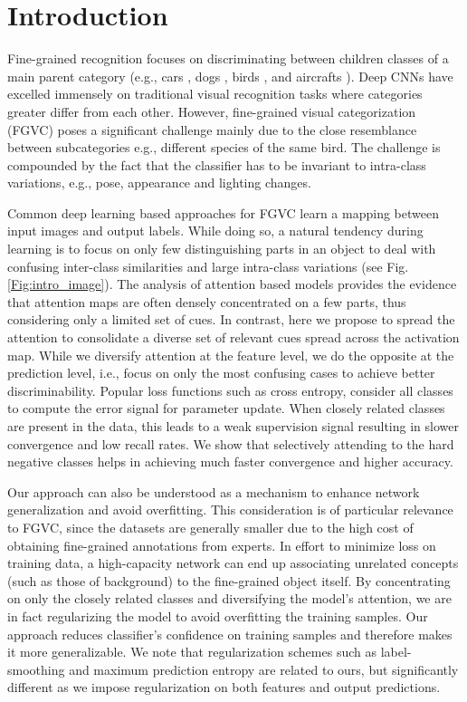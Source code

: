 \documentclass[letterpaper]{article} \usepackage{aaai20}  \usepackage{times}  \usepackage{helvet} \usepackage{courier}  \usepackage[hyphens]{url}  \usepackage{graphicx} \usepackage{multirow}
\begin{document}
\section{Introduction}
Fine-grained recognition focuses on discriminating between children classes of a main parent category (e.g., cars \cite{dataset_cars}, dogs \cite{dataset_dogs}, birds  \cite{dataset_cub}, and aircrafts \cite{dataset_aircraft}). Deep CNNs have excelled immensely on traditional visual recognition tasks where categories greater differ from each other.  However, fine-grained visual categorization (FGVC) poses a significant challenge mainly due to the close resemblance between subcategories e.g., different species of the same bird. The challenge is compounded by the fact that the classifier has to be invariant to intra-class variations, e.g., pose, appearance and lighting changes.


Common deep learning based approaches for FGVC learn a mapping between input images and output labels. While doing so, a natural tendency during learning is to focus on only few distinguishing parts in an object to deal with confusing inter-class similarities and large intra-class variations (see Fig. \ref{Fig:intro_image}). The analysis of attention based models provides the evidence that attention maps are often densely concentrated on a few parts, thus considering only a limited set of cues. In contrast, here we propose to spread the attention to  consolidate a diverse set of relevant cues spread across the activation map. While we diversify attention at the feature level, we do the opposite at the prediction level, i.e., focus on only the most confusing cases to achieve better discriminability. Popular loss functions such as cross entropy, consider all classes to compute the error signal for parameter update. When closely related classes are present in the data, this leads to a weak supervision signal resulting in slower convergence and low recall rates. We show that selectively attending to the hard negative 
classes helps in achieving much faster convergence and higher accuracy.

Our approach can also be understood as a mechanism to enhance network generalization and avoid overfitting. This consideration is of particular relevance to FGVC, since the datasets are generally smaller due to the high cost of obtaining fine-grained annotations from experts. In effort to minimize loss on training data, a high-capacity network can end up associating unrelated concepts (such as those of background) to the fine-grained object itself. By concentrating on only the closely related classes and diversifying the model's attention, we are in fact regularizing the model to avoid overfitting the training samples. Our approach reduces classifier’s confidence on training samples and therefore makes it more generalizable. We note that regularization schemes such as label-smoothing \cite{szegedy2016rethinking} and maximum prediction entropy \cite{max_entropy} are related to ours, but significantly different as we impose regularization on both features and output predictions.
\end{document}
